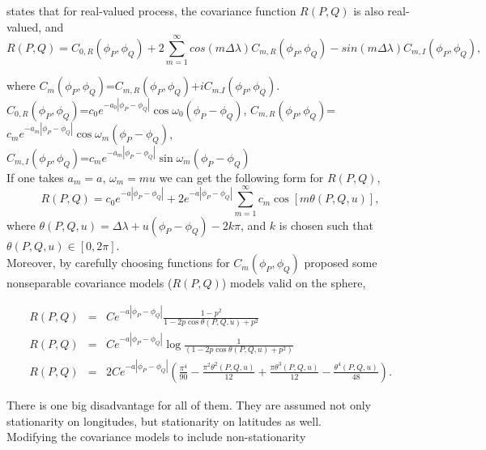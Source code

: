 	
	\cite[Remark 2.4]{Huang2012}states that for real-valued process, the covariance function $R(P,Q)$ is also real-valued, and
	\[
		R(P,Q)=C_{0,R}(\phi_P,\phi_Q)+2 \sum_{m=1}^{\infty}cos(m\Delta\lambda)C_{m,R}(\phi_P,\phi_Q)-sin(m\Delta\lambda)C_{m,I}(\phi_P,\phi_Q),
	\]
	
	where $C_m(\phi_P,\phi_Q)$=$C_{m,R}(\phi_P,\phi_Q)$+$iC_{m.I}(\phi_P,\phi_Q)$.\\
	$C_{0,R}(\phi_P,\phi_Q)$=$c_0e^{-a_0|\phi_P-\phi_Q|}\cos\omega_0(\phi_P-\phi_Q)$, $C_{m,R}(\phi_P,\phi_Q)$=$c_me^{-a_m|\phi_P-\phi_Q|}\cos\omega_m(\phi_P-\phi_Q)$,\\
	$C_{m,I}(\phi_P,\phi_Q)$=$c_me^{-a_m|\phi_P-\phi_Q|}\sin\omega_m(\phi_P-\phi_Q)$\\
	
	If one takes $a_m=a$, $\omega_m=mu$ we can get the following form for $R(P,Q)$,
	\[
		R(P,Q)=c_0e^{-a|\phi_P-\phi_Q|}+2e^{-a|\phi_P-\phi_Q|} \sum_{m=1}^{\infty}c_m\cos[m\theta(P,Q,u)],
	\]
	where $\theta(P,Q,u)=\Delta\lambda+u(\phi_P-\phi_Q)-2k\pi$, and $k$ is chosen such that $\theta(P,Q,u)\in[0,2\pi]$.\\
	
	
	
	Moreover, by carefully choosing functions for $C_m(\phi_P, \phi_Q)$ \cite{Huang2012} proposed some nonseparable covariance models ($R(P,Q)$) models valid on the sphere,
	
	\begin{eqnarray}
		R(P,Q) &=& Ce^{-a|\phi_P-\phi_Q|} \frac{1-p^2}{1-2p \cos\theta(P,Q,u)+p^2}  \\
		R(P,Q) &=& Ce^{-a|\phi_P-\phi_Q|} \log\frac{1}{(1-2p\cos\theta(P,Q,u) + p^2)} \\
		R(P,Q) &=& 2Ce^{-a|\phi_P-\phi_Q|}\left(\frac{\pi^4}{90}-\frac{\pi^2\theta^2(P,Q,u)}{12}+\frac{\pi\theta^3(P,Q,u)}{12}-\frac{\theta^4(P,Q,u)}{48}\right).
	\end{eqnarray}
	
	There is one big disadvantage for all of them. They are assumed not only stationarity on longitudes, but stationarity on latitudes as well. \\
	
	Modifying the covariance models to include non-stationarity
	

